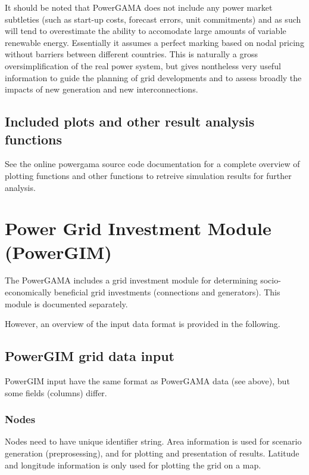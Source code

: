 \documentclass{article}
\begin{document}
It should be noted that PowerGAMA does not include any power market subtleties (such as start-up costs, forecast errors, unit commitments) and as such will tend to overestimate the ability to accomodate large amounts of variable renewable energy. Essentially it assumes a perfect marking based on nodal pricing without barriers between different countries. This is naturally a gross oversimplification of the real power system, but gives nontheless very useful information to guide the planning of grid developments and to assess broadly the impacts of new generation and new interconnections.


\subsection{Included plots and other result analysis functions}

See the online  powergama source code documentation for a complete overview of plotting functions and other functions to retreive simulation results for further analysis.



\section{Power Grid Investment Module (PowerGIM)}
The PowerGAMA includes a grid investment module for determining socio-economically beneficial grid investments (connections and generators). This module is documented separately.

However, an overview of the input data format is provided in the following.


\subsection{PowerGIM grid data input}
PowerGIM input have the same format as PowerGAMA data (see above), but some fields (columns) differ.

\subsubsection{Nodes}
Nodes need to have unique identifier string. Area information is used for scenario generation (preprosessing), and for plotting and presentation of results.
Latitude and longitude information is only used for plotting the grid on a map.
\end{document}
